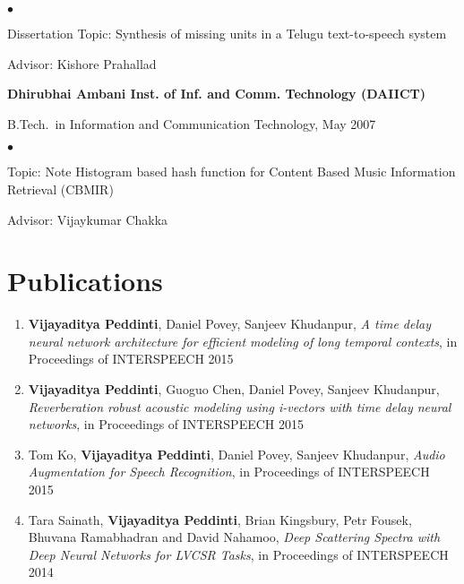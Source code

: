 \documentclass[margin,line,pifont,palatino,courier]{res}
\newenvironment{list1}{
  \begin{list}{\ding{113}}{%
      \setlength{\itemsep}{0in}
      \setlength{\parsep}{0in} \setlength{\parskip}{0in}
      \setlength{\topsep}{0in} \setlength{\partopsep}{0in}
      \setlength{\leftmargin}{0.17in}}}{\end{list}}
\newenvironment{list2}{
  \begin{list}{$\bullet$}{%
      \setlength{\itemsep}{0in}
      \setlength{\parsep}{0in} \setlength{\parskip}{0in}
      \setlength{\topsep}{0in} \setlength{\partopsep}{0in}
      \setlength{\leftmargin}{0.2in}}}{\end{list}}
\begin{document}
\begin{resume}
\begin{list1}
\begin{list2}
\vspace*{.05in}
\item Dissertation Topic:  Synthesis of missing units in a Telugu text-to-speech system 
\item Advisor: Kishore Prahallad
\end{list2}
\end{list1}

{\bf Dhirubhai Ambani Inst. of Inf. and Comm. Technology (DAIICT)}\\
\vspace*{-.1in}
\begin{list1}
\item[] B.Tech.~in Information and Communication Technology, May 2007

\begin{list2}
\vspace*{.05in}
\item Topic: Note Histogram based hash function for Content Based Music Information Retrieval (CBMIR) 
\item Advisor: Vijaykumar Chakka
\end{list2}
\end{list1}


\section{\sc Publications}
\begin{enumerate}


\item \textbf{Vijayaditya Peddinti}, Daniel Povey, Sanjeev Khudanpur,
\textit{A time delay neural network architecture for efficient modeling of long temporal contexts}, in Proceedings of INTERSPEECH 2015

\item \textbf{Vijayaditya Peddinti}, Guoguo Chen, Daniel Povey, Sanjeev Khudanpur,
\textit{Reverberation robust acoustic modeling using i-vectors with time delay neural networks}, in Proceedings of INTERSPEECH 2015

\item Tom Ko, \textbf{Vijayaditya Peddinti}, Daniel Povey, Sanjeev Khudanpur,
\textit{Audio Augmentation for Speech Recognition}, in Proceedings of INTERSPEECH 2015

\item Tara Sainath, \textbf{Vijayaditya Peddinti}, Brian Kingsbury, Petr Fousek, Bhuvana Ramabhadran and David Nahamoo,
\textit{Deep Scattering Spectra with Deep Neural Networks for LVCSR Tasks}, in Proceedings of INTERSPEECH 2014


\end{enumerate}
\end{resume}
\end{document}

